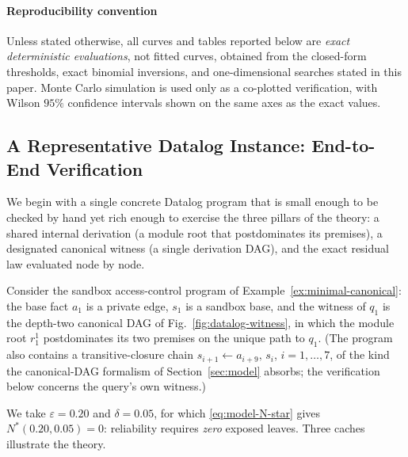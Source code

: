 \documentclass[journal]{IEEEtran}
\numberwithin{equation}{section}
\begin{document}
\paragraph*{Reproducibility convention}
Unless stated otherwise, all curves and tables reported below are
\emph{exact deterministic evaluations}, not fitted curves, obtained from
the closed-form thresholds, exact binomial inversions, and one-dimensional
searches stated in this paper.  Monte Carlo simulation is used only as a
co-plotted verification, with Wilson \(95\%\) confidence intervals shown on
the same axes as the exact values.

\subsection{A Representative Datalog Instance: End-to-End Verification}
\label{subsec:numerical-datalog}

We begin with a single concrete Datalog program that is small enough to be
checked by hand yet rich enough to exercise the three pillars of the
theory: a shared internal derivation (a module root that postdominates its
premises), a designated canonical witness (a single derivation DAG), and
the exact residual law evaluated node by node.

Consider the sandbox access-control program of
Example~\ref{ex:minimal-canonical}: the base fact \(a_{1}\) is a private
edge, \(s_{1}\) is a sandbox base, and the witness of \(q_{1}\) is the
depth-two canonical DAG of Fig.~\ref{fig:datalog-witness}, in which the
module root \(r_{1}^{1}\) postdominates its two premises on the unique
path to \(q_{1}\).  (The program also contains a transitive-closure chain
\(s_{i+1}\leftarrow a_{i+9},\,s_{i}\), \(i=1,\ldots,7\), of the kind the
canonical-DAG formalism of Section~\ref{sec:model} absorbs; the
verification below concerns the query's own witness.)

We take \(\varepsilon=0.20\) and \(\delta=0.05\), for which
\eqref{eq:model-N-star} gives \(N^{*}(0.20,0.05)=0\): reliability requires
\emph{zero} exposed leaves.  Three caches illustrate the theory.
\end{document}
